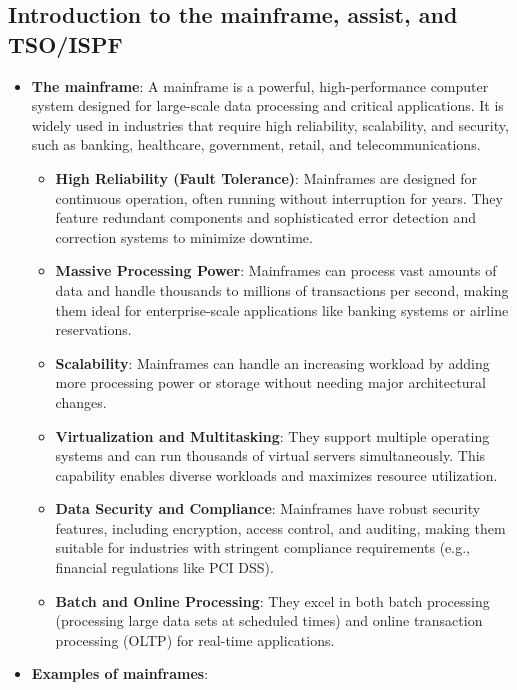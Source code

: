 \documentclass{report}
\begin{document}
    \pagebreak 
    \subsection{Introduction to the mainframe, assist, and TSO/ISPF}
    \begin{itemize}
        \item \textbf{The mainframe}: A mainframe is a powerful, high-performance computer system designed for large-scale data processing and critical applications. It is widely used in industries that require high reliability, scalability, and security, such as banking, healthcare, government, retail, and telecommunications.
            \begin{itemize}
                \item \textbf{High Reliability (Fault Tolerance)}: Mainframes are designed for continuous operation, often running without interruption for years. They feature redundant components and sophisticated error detection and correction systems to minimize downtime.
                \item \textbf{Massive Processing Power}: Mainframes can process vast amounts of data and handle thousands to millions of transactions per second, making them ideal for enterprise-scale applications like banking systems or airline reservations.
                \item \textbf{Scalability}: Mainframes can handle an increasing workload by adding more processing power or storage without needing major architectural changes.
                \item \textbf{Virtualization and Multitasking}: They support multiple operating systems and can run thousands of virtual servers simultaneously. This capability enables diverse workloads and maximizes resource utilization.
                \item \textbf{Data Security and Compliance}: Mainframes have robust security features, including encryption, access control, and auditing, making them suitable for industries with stringent compliance requirements (e.g., financial regulations like PCI DSS).
                \item \textbf{Batch and Online Processing}: They excel in both batch processing (processing large data sets at scheduled times) and online transaction processing (OLTP) for real-time applications.
            \end{itemize}
        \item \textbf{Examples of mainframes}:
            \begin{itemize}

\end{itemize}
\end{itemize}
\end{document}

